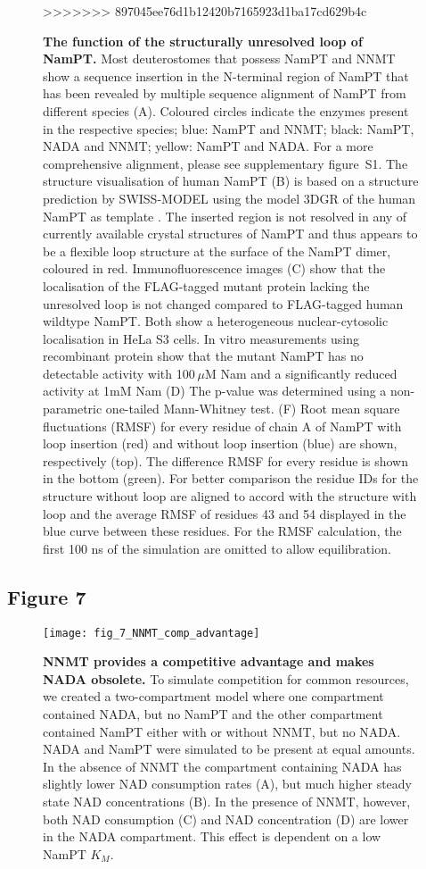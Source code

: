 \begin{figure}[ht]
  \caption{\textbf{The function of the structurally unresolved loop of NamPT.} Most deuterostomes that possess NamPT and NNMT show a sequence insertion in the N-terminal region of NamPT that has been revealed by multiple sequence alignment of NamPT from different species (A). Coloured circles indicate the enzymes present in the respective species; blue: NamPT and NNMT; black: NamPT, NADA and NNMT; yellow: NamPT and NADA. For a more comprehensive alignment, please see supplementary figure~S1. The structure visualisation of human NamPT (B) is based on a structure prediction by SWISS-MODEL \cite{Arnold2006,Biasini2014} using the model 3DGR of the human NamPT as template \cite{Burgos2009}. The inserted region is not resolved in any of currently available crystal structures of NamPT and thus appears to be a flexible loop structure at the surface of the NamPT dimer, coloured in red. Immunofluorescence images (C) show that the localisation of the FLAG-tagged mutant protein lacking the unresolved loop is not changed compared to FLAG-tagged human wildtype NamPT. Both show a heterogeneous nuclear-cytosolic localisation in HeLa S3 cells. In vitro measurements using recombinant protein show that the mutant NamPT has no detectable activity with 100 $\mu$M Nam and a significantly reduced activity at 1mM Nam (D) The p-value was determined using a non-parametric one-tailed Mann-Whitney test. (F) Root mean square fluctuations (RMSF) for every residue of chain A of NamPT with loop insertion (red) and without loop insertion (blue) are shown, respectively (top). The difference RMSF for every residue is shown in the bottom (green). For better comparison the residue IDs for the structure without loop are aligned to accord with the structure with loop and the average RMSF of residues 43 and 54 displayed in the blue curve between these residues. For the RMSF calculation, the first 100 ns of the simulation are omitted to allow equilibration.}
>>>>>>> 897045ee76d1b12420b7165923d1ba17cd629b4c
  \label{fig:unresolved_loop}
\end{figure}

\newpage


\subsection*{Figure 7}

\begin{figure}[ht]
  \centering
  \texttt{[image: fig\_7\_NNMT\_comp\_advantage]}
  \caption{\textbf{NNMT provides a competitive advantage and makes NADA obsolete.} To simulate competition for common resources, we created a two-compartment model where one compartment contained NADA, but no NamPT and the other compartment contained NamPT either with or without NNMT, but no NADA. NADA and NamPT were simulated to be present at equal amounts. In the absence of NNMT the compartment containing NADA has slightly lower NAD consumption rates (A), but much higher steady state NAD concentrations (B). In the presence of NNMT, however, both NAD consumption (C) and NAD concentration (D) are lower in the NADA compartment. This effect is dependent on a low NamPT $K_{M}$.}
  \label{fig:NNMT_comp_advantage}
\end{figure}

